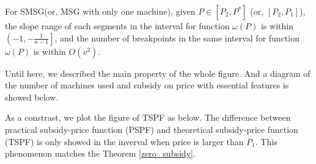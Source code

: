 \begin{thm}\label{SMSG}
For SMSG(or, MSG with only one machine), given $P \in [P_2, P^*]$ (or, $[P_2,P_1]$),
the slope range of each segments in the interval for function $\omega(P)$ is within $\left(-1, -\frac{1}{n-1} \right]$, and the number of breakpoints in the same interval for function $\omega(P)$ is within $O(v^2)$.
\end{thm}

Until here, we described the main property of the whole figure.
And a diagram of the number of machines used and subsidy on price with essential features is showed below.


As a constrast, we plot the figure of TSPF as below. The difference between practical subsidy-price function (PSPF) and theoretical subsidy-price function (TSPF) is only showed in the inverval when price is larger than $P_1$. This phenomenon matches the Theorem \ref{zero_subsidy}.



